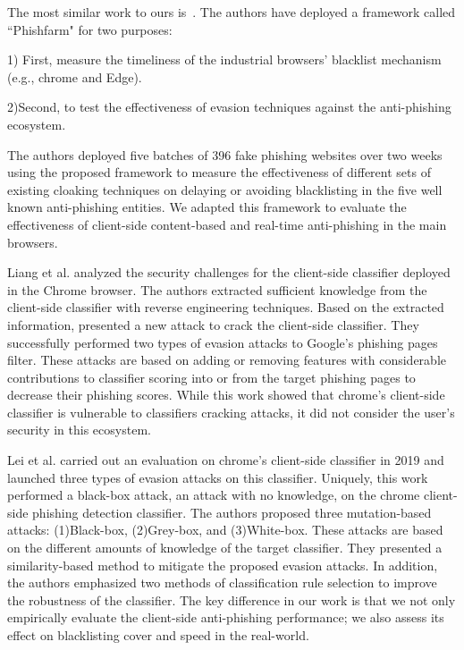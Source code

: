 The most similar work to ours is~\cite{oest2019phishfarm}. The authors have deployed a framework called ``Phishfarm" for two purposes: 

1) First, measure the timeliness of the industrial browsers' blacklist mechanism (e.g., chrome and Edge). 

2)Second, to test the effectiveness of evasion techniques against the anti-phishing ecosystem.

The authors deployed five batches of 396 fake phishing websites over two weeks using the proposed framework to measure the effectiveness of different sets of existing cloaking techniques on delaying or avoiding blacklisting in the five well known anti-phishing entities.
We adapted this framework to evaluate the effectiveness of client-side content-based and real-time anti-phishing in the main browsers.

Liang et al.\cite{liang2016cracking} analyzed the security challenges for the client-side classifier deployed in the Chrome browser. 
The authors extracted sufficient knowledge from the client-side classifier with reverse engineering techniques. Based on the extracted information, presented a new attack to crack the client-side classifier. They successfully performed two types of evasion attacks to Google's phishing pages filter. These attacks are based on adding or removing features with considerable contributions to classifier scoring into or from the target phishing pages to decrease their phishing scores.
While this work showed that chrome's client-side classifier is vulnerable to classifiers cracking attacks, it did not consider the user's security in this ecosystem.


Lei et al.\cite{lei2020advanced} carried out an evaluation on chrome's client-side classifier in 2019 and launched three types of evasion attacks on this classifier.
Uniquely, this work performed a black-box attack, an attack with no knowledge, on the chrome client-side phishing detection classifier.
The authors proposed three mutation-based attacks: (1)Black-box, (2)Grey-box, and (3)White-box. These attacks are based on the different amounts of knowledge of the target classifier. 
They presented a similarity-based method to mitigate the proposed evasion attacks. 
In addition, the authors emphasized two methods of classification rule selection to improve the robustness of the classifier.
The key difference in our work is that we not only empirically evaluate the client-side anti-phishing performance; we also assess its effect on blacklisting cover and speed in the real-world.  



